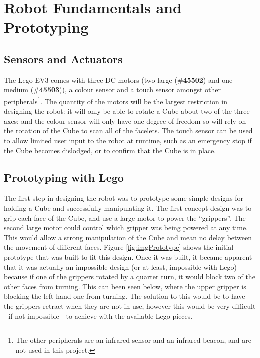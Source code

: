 \documentclass{report}
\newcommand{\tbo}[1]{\textbf{#1}}
\newcommand{\legopiece}[1]{(\#\tbo{#1})}
\begin{document}
    \section{Robot Fundamentals and Prototyping}
    
    \subsection{Sensors and Actuators}
    
    The Lego EV3 comes with three DC motors (two large \legopiece{45502} and one medium \legopiece{45503}), a colour sensor and a touch sensor amongst other peripherals\footnote{The other peripherals are an infrared sensor and an infrared beacon, and are not used in this project.}. The quantity of the motors will be the largest restriction in designing the robot: it will only be able to rotate a Cube about two of the three axes; and the colour sensor will only have one degree of freedom so will rely on the rotation of the Cube to scan all of the facelets. The touch sensor can be used to allow limited user input to the robot at runtime, such as an emergency stop if the Cube becomes dislodged, or to confirm that the Cube is in place.
    
    \subsection{Prototyping with Lego}
    
    The first step in designing the robot was to prototype some simple designs for holding a Cube and successfully manipulating it. The first concept design was to grip each face of the Cube, and use a large motor to power the \enquote{grippers}. The second large motor could control which gripper was being powered at any time. This would allow a strong manipulation of the Cube and mean no delay between the movement of different faces. Figure \ref{fig:imgPrototype} shows the initial prototype that was built to fit this design. Once it was built, it became apparent that it was actually an impossible design (or at least, impossible with Lego) because if one of the grippers rotated by a quarter turn, it would block two of the other faces from turning. This can been seen below, where the upper gripper is blocking the left-hand one from turning. The solution to this would be to have the grippers retract when they are not in use, however this would be very difficult - if not impossible - to achieve with the available Lego pieces.
    
\end{document}
